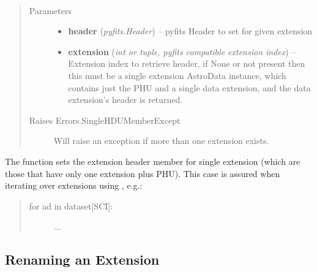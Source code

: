 \documentclass[letterpaper,10pt,english]{sphinxmanual}
\begin{document}
\begin{fulllineitems}
\label{chapter_AstroDataClass:astrodata.data.AstroData.set_header}~\begin{quote}\begin{description}
\item[{Parameters}] \leavevmode\begin{itemize}
\item {} 
\textbf{header} (\emph{pyfits.Header}) -- pyfits Header to set for given extension

\item {} 
\textbf{extension} (\emph{int or tuple, pyfits compatible extension index}) -- Extension index to retrieve header, if None
or not present then this must be a single extension AstroData
instance, which contains just the PHU and a single data extension,
and the data extension's header is returned.

\end{itemize}

\item[{Raises Errors.SingleHDUMemberExcept}] \leavevmode
Will raise an exception if more 
than one extension exists.

\end{description}\end{quote}

The  function sets the extension header member for single
extension (which are those that have only one extension plus PHU). This
case  is assured when iterating over extensions using , e.g.:
\begin{quote}
\begin{description}
\item[{for ad in dataset{[}SCI{]}: }] \leavevmode
...

\end{description}
\end{quote}

\end{fulllineitems}



\subsection{Renaming an Extension}
\label{chapter_AstroDataClass:renaming-an-extension}
\end{document}
